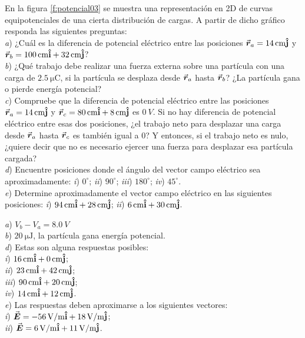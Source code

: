 %
\begin{Exercise}\label{p:potencial03}
  En la figura \ref{f:potencial03} se muestra una representación en 2D de curvas equipotenciales de una cierta distribución de cargas. A partir de dicho gráfico responda las siguientes preguntas:\\
  \textit{a}) ¿Cuál es la diferencia de potencial eléctrico entre las posiciones $\va*{r}_a = \SI{14}{cm}\vu{j}$ y $\va*{r}_b = \SI{100}{cm}\vu{i} + \SI{32}{cm}\vu{j}$?\\
  \textit{b}) ¿Qué trabajo debe realizar una fuerza externa sobre una partícula con una carga de $\SI{2.5}{\micro\coulomb}$, si la partícula se desplaza desde $\va*{r}_a$ hasta $\va*{r}_b$? ¿La partícula gana o pierde energía potencial?\\
  \textit{c}) Compruebe que la diferencia de potencial eléctrico entre las posiciones $\va*{r}_a = \SI{14}{cm}\vu{j}$ y $\va*{r}_c = \SI{80}{cm}\vu{i} + \SI{8}{cm}\vu{j}$ es $\SI{0}{V}$. Si no hay diferencia de potencial eléctrico entre esas dos posiciones, ¿el trabajo neto para desplazar una carga desde $\va*{r}_a$ hasta $\va*{r}_c$ es también igual a $0$? Y entonces, si el trabajo neto es nulo, ¿quiere decir que no es necesario ejercer una fuerza para desplazar esa partícula cargada?\\
  \textit{d}) Encuentre posiciones donde el ángulo del vector campo eléctrico sea aproximadamente: \textit{i}) $0^\circ$; \textit{ii}) $90^\circ$; \textit{iii}) $180^\circ$; \textit{iv}) $45^\circ$.\\
  \textit{e}) Determine aproximadamente el vector campo eléctrico en las siguientes posiciones: \textit{i}) $\SI{94}{cm}\vu{i} + \SI{28}{cm}\vu{j}$; \textit{ii}) $\SI{6}{cm}\vu{i} + \SI{30}{cm}\vu{j}$.
\end{Exercise}
\begin{Answer}
	\begin{minipage}[t]{.4\textwidth}
    \textit{a}) $V_b-V_a = \SI{8.0}{V}$\\
    \textit{b}) $\SI{20}{\micro\joule}$, la partícula gana energía potencial.\\
    \textit{d}) Estas son alguna respuestas posibles:\\
    \textit{i}) $\SI{16}{cm}\vu{i} + \SI{0}{cm}\vu{j}$;\\
    \textit{ii}) $\SI{23}{cm}\vu{i} + \SI{42}{cm}\vu{j}$;\\
    \textit{iii}) $\SI{90}{cm}\vu{i} + \SI{20}{cm}\vu{j}$;\\
    \textit{iv}) $\SI{14}{cm}\vu{i} + \SI{12}{cm}\vu{j}$.\\
    \textit{e}) Las respuestas deben aproximarse a los siguientes vectores:\\
    \textit{i}) $\va*{E} = \SI{-56}{V/m}\vu{i} +\SI{18}{V/m}\vu{j}$;\\
    \textit{ii}) $\va*{E} = \SI{6}{V/m}\vu{i} +\SI{11}{V/m}\vu{j}$.
  \end{minipage}
\end{Answer}
